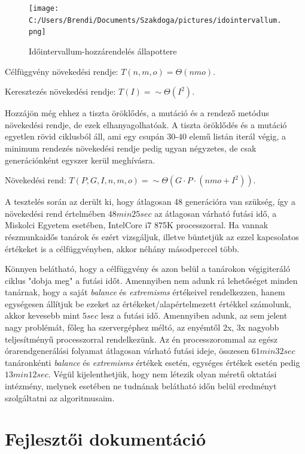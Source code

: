 \documentclass[12pt,a4paper]{report}
\begin{document}
\begin{figure}
\texttt{[image: C:/Users/Brendi/Documents/Szakdoga/pictures/idointervallum.png]}
\caption{Időintervallum-hozzárendelés állapottere}
\end{figure}

Célfüggvény növekedési rendje: $T(n,m,o)=\Theta(nmo)$.

Keresztezés növekedési rendje: $T(I)=\sim \Theta(I^2)$.

Hozzájön még ehhez a tiszta öröklődés, a mutáció és a rendező metódus növekedési rendje, de ezek elhanyagolhatóak. A tiszta öröklődés és a mutáció egyetlen rövid ciklusból áll, ami egy csupán 30-40 elemű listán iterál végig, a minimum rendezés növekedési rendje pedig ugyan négyzetes, de csak generációnként egyszer kerül meghívásra.

Növekedési rend: $T(P,G,I,n,m,o)=\sim \Theta(G \cdot P \cdot (nmo+I^2))$.

A tesztelés során az derült ki, hogy átlagosan 48 generációra van szükség, így a növekedési rend értelmében $48min 25sec$ az átlagosan várható futási idő, a Miskolci Egyetem esetében, IntelCore i7 875K processzorral. Ha vannak részmunkaidős tanárok és ezért vizsgáljuk, illetve büntetjük az ezzel kapcsolatos értékeket is a célfüggvényben, akkor néhány másodperccel több.

Könnyen belátható, hogy a célfüggvény és azon belül a tanárokon végigiteráló ciklus "dobja meg" a futási időt. Amennyiben nem adunk rá lehetőséget minden tanárnak, hogy a saját \textit{balance} és \textit{extremisms} értékeivel rendelkezzen, hanem egységesen állítjuk be ezeket az értékeket/alapértelmezett értékkel számolunk, akkor kevesebb mint $5 sec$ lesz a futási idő. Amennyiben adunk, az sem jelent nagy problémát, főleg ha szervergéphez méltó, az enyémtől 2x, 3x nagyobb teljesítményű processzorral rendelkezünk. Az én processzorommal az egész órarendgenerálási folyamat átlagosan várható futási ideje, összesen $61min 32sec$ tanáronkénti \textit{balance} és \textit{extremisms} értékek esetén, egységes értékek esetén pedig $13min 12sec$. Végül kijelenthetjük, hogy nem létezik olyan méretű oktatási intézmény, melynek esetében ne tudnának belátható időn belül eredményt szolgáltatni az algoritmusaim.

\newpage

\chapter{Fejlesztői dokumentáció}
\end{document}
